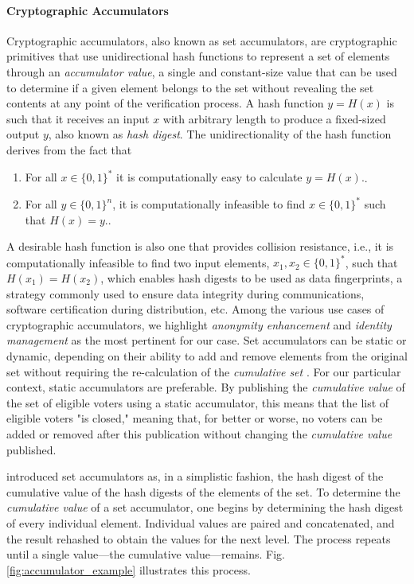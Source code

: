\documentclass[../main.tex]{subfiles}
\begin{document}
\paragraph{Cryptographic Accumulators}
\label{sec:cryptographic_accumulators}
Cryptographic accumulators, also known as set accumulators, are cryptographic primitives that use unidirectional hash functions to represent a set of elements through an \textit{accumulator value}, a single and constant-size value that can be used to determine if a given element belongs to the set without revealing the set contents at any point of the verification process. A hash function $ y = H(x) $ is such that it receives an input $ x $ with arbitrary length to produce a fixed-sized output $ y $, also known as \textit{hash digest}. The unidirectionality of the hash function derives from the fact that

\begin{enumerate}

    \item{For all $ x \in \{0, 1\}^* $ it is computationally easy to calculate $ y = H(x) $.}.

    \item{For all $ y \in \{0, 1\}^n $, it is computationally infeasible to find $ x \in \{0, 1\}^* $ such that $ H(x) = y $.}.

\end{enumerate}

A desirable hash function is also one that provides collision resistance, i.e., it is computationally infeasible to find two input elements, $ x_1, x_2 \in \{0,1\}^* $, such that $ H(x_1) = H(x_2) $, which enables hash digests to be used as data fingerprints, a strategy commonly used to ensure data integrity during communications, software certification during distribution, etc. Among the various use cases of cryptographic accumulators, we highlight \textit{anonymity enhancement} and \textit{identity management} as the most pertinent for our case. Set accumulators can be static or dynamic, depending on their ability to add and remove elements from the original set without requiring the re-calculation of the \textit{cumulative set} \cite{Loporchio2023}. For our particular context, static accumulators are preferable. By publishing the \textit{cumulative value} of the set of eligible voters using a static accumulator, this means that the list of eligible voters "is closed," meaning that, for better or worse, no voters can be added or removed after this publication without changing the \textit{cumulative value} published.
\par
\cite{Benaloh1993} introduced set accumulators as, in a simplistic fashion, the hash digest of the cumulative value of the hash digests of the elements of the set. To determine the \textit{cumulative value} of a set accumulator, one begins by determining the hash digest of every individual element. Individual values are paired and concatenated, and the result rehashed to obtain the values for the next level. The process repeats until a single value—the cumulative value—remains. Fig. \ref{fig:accumulator_example} illustrates this process.
\end{document}
